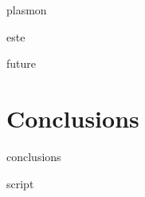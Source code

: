 \documentclass{uicthesi}
\begin{document}
  {plasmon}

  {este}

  {future}

\chapter{Conclusions}

  {conclusions}

\appendix
  {script}

\newpage



\end{document}
